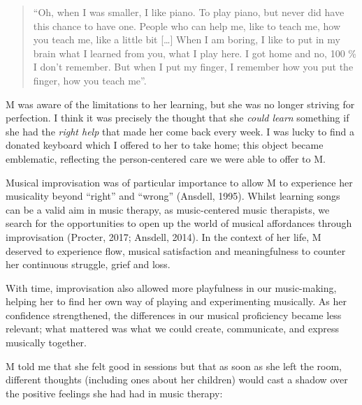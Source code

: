 \documentclass[authordate, empirical]{jote-new-article}
\begin{document}
\begin{quote}
  “Oh, when I was smaller, I like piano. To play piano, but never did have this chance to have one. People who can help me, like to teach me, how you teach me, like a little bit […] When I am boring, I like to put in my brain what I learned from you, what I play here. I got home and no, 100 \% I don't remember. But when I put my finger, I remember how you put the finger, how you teach me”.
\end{quote}







M was aware of the limitations to her learning, but she was no longer striving for perfection. I think it was precisely the thought that she \emph{could learn }something if she had the \emph{right help} that made her come back every week. I was lucky to find a donated keyboard which I offered to her to take home; this object became emblematic, reflecting the person-centered care we were able to offer to M.







Musical improvisation was of particular importance to allow M to experience her musicality beyond “right” and “wrong” (Ansdell, 1995). Whilst learning songs can be a valid aim in music therapy, as music-centered music therapists, we search for the opportunities to open up the world of musical affordances through improvisation (Procter, 2017; Ansdell, 2014). In the context of her life, M deserved to experience flow, musical satisfaction and meaningfulness to counter her continuous struggle, grief and loss.







With time, improvisation also allowed more playfulness in our music-making, helping her to find her own way of playing and experimenting musically. As her confidence strengthened, the differences in our musical proficiency became less relevant; what mattered was what we could create, communicate, and express musically together.







M told me that she felt good in sessions but that as soon as she left the room, different thoughts (including ones about her children) would cast a shadow over the positive feelings she had had in music therapy:
\end{document}
